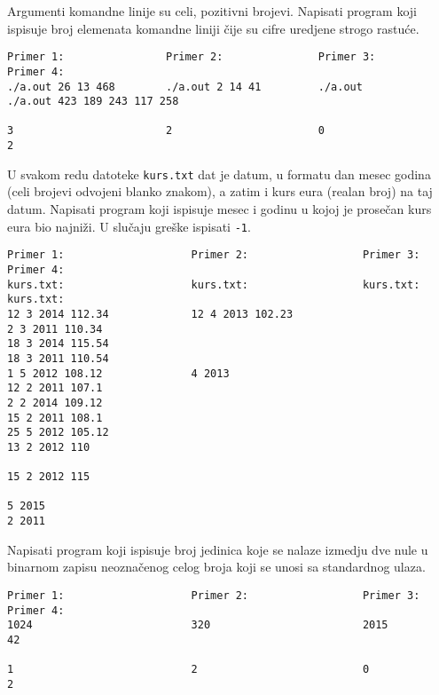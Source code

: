 \begin{z}
Argumenti komandne linije su celi, pozitivni brojevi.
Napisati program koji ispisuje broj elemenata komandne
liniji \v cije su cifre uredjene strogo rastu\'ce.
\end{z}
\begin{verbatim}
Primer 1:                Primer 2:               Primer 3:              Primer 4:
./a.out 26 13 468        ./a.out 2 14 41         ./a.out                ./a.out 423 189 243 117 258

3                        2                       0                      2
\end{verbatim}

\begin{z}
U svakom redu datoteke {\tt kurs.txt} dat je datum, u formatu dan mesec godina (celi brojevi odvojeni blanko znakom), a zatim
i kurs eura (realan broj) na taj datum. Napisati program koji ispisuje mesec i godinu u kojoj je prose\v can kurs
eura bio najni\v zi. U slu\v caju gre\v ske ispisati {\tt -1}.
\end{z}
\begin{verbatim}
Primer 1:                    Primer 2:                  Primer 3:                 Primer 4:
kurs.txt:                    kurs.txt:                  kurs.txt:                 kurs.txt:
12 3 2014 112.34             12 4 2013 102.23                                     2 3 2011 110.34
18 3 2014 115.54                                                                  18 3 2011 110.54
1 5 2012 108.12              4 2013                                               12 2 2011 107.1
2 2 2014 109.12                                                                   15 2 2011 108.1
25 5 2012 105.12                                                                  13 2 2012 110
                                                                                  15 2 2012 115

5 2015                                                                            2 2011
\end{verbatim}

\begin{z}
Napisati program koji ispisuje broj jedinica koje se nalaze izmedju
dve nule u binarnom zapisu neozna\v cenog celog broja koji se unosi sa
standardnog ulaza.
\end{z}
\begin{verbatim}
Primer 1:                    Primer 2:                  Primer 3:                 Primer 4:
1024                         320                        2015                      42

1                            2                          0                         2
\end{verbatim}

